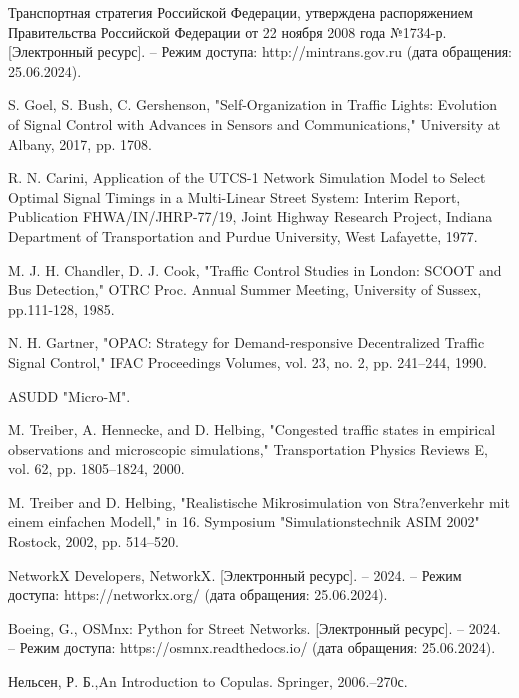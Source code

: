 \documentclass[11pt]{ubs}
\begin{document}
\newpage
\begin{thebibliography}{10}
   Транспортная стратегия Российской Федерации, утверждена распоряжением Правительства Российской Федерации от 22 ноября 2008 года №1734-р. [Электронный ресурс]. – Режим доступа: {http://mintrans.gov.ru} (дата обращения: 25.06.2024).

   S. Goel, S. Bush, C. Gershenson, "Self-Organization in Traffic Lights: Evolution of Signal Control with Advances in Sensors and Communications," University at Albany,  2017, pp. 1708.

   R. N. Carini, {Application of the UTCS-1 Network Simulation Model to Select Optimal Signal Timings in a Multi-Linear Street System: Interim Report}, Publication FHWA/IN/JHRP-77/19, Joint Highway Research Project, Indiana Department of Transportation and Purdue University, West Lafayette, 1977.

   M. J. H. Chandler, D. J. Cook, "Traffic Control Studies in London: SCOOT and Bus Detection," OTRC Proc. Annual Summer Meeting, University of Sussex,  pp.111-128, 1985.

   N. H. Gartner, "OPAC: Strategy for Demand-responsive Decentralized Traffic Signal Control," IFAC Proceedings Volumes, vol. 23, no. 2, pp. 241–244, 1990. 

   ASUDD "Micro-M".

   M. Treiber, A. Hennecke, and D. Helbing, "Congested traffic states in empirical observations and microscopic simulations," {Transportation Physics Reviews E}, vol. 62, pp. 1805–1824, 2000.

   M. Treiber and D. Helbing, "Realistische Mikrosimulation von Stra?enverkehr mit einem einfachen Modell," in {16. Symposium "Simulationstechnik ASIM 2002" Rostock}, 2002, pp. 514–520.

   NetworkX Developers, {NetworkX}. [Электронный ресурс]. – 2024. – Режим доступа: {https://networkx.org/} (дата обращения: 25.06.2024).

   Boeing, G., {OSMnx: Python for Street Networks}. [Электронный ресурс]. – 2024. – Режим доступа: {https://osmnx.readthedocs.io/} (дата обращения: 25.06.2024).


  
   Нельсен, Р. Б.,{An Introduction to Copulas}. Springer, 2006.--270с.


\end{thebibliography}
\end{document}
